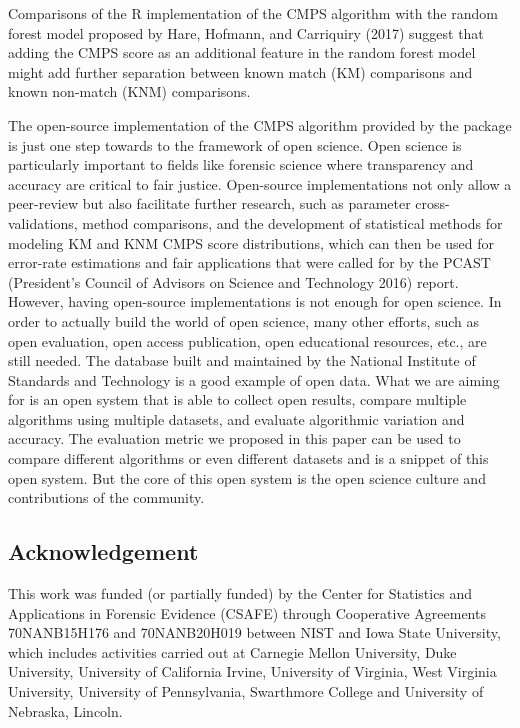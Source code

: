 Comparisons of the R implementation of the CMPS algorithm with the random forest model proposed by Hare, Hofmann, and Carriquiry (2017) suggest that adding the CMPS score as an additional feature in the random forest model might add further separation between known match (KM) comparisons and known non-match (KNM) comparisons.

The open-source implementation of the CMPS algorithm provided by the  package is just one step towards to the framework of open science. Open science is particularly important to fields like forensic science where transparency and accuracy are critical to fair justice.
Open-source implementations not only allow a peer-review but also facilitate further research, such as parameter cross-validations, method comparisons, and the development of statistical methods for modeling KM and KNM CMPS score distributions, which can then be used for error-rate estimations and fair applications that were called for by the PCAST (President's Council of Advisors on Science and Technology 2016) report.
However, having open-source implementations is not enough for open science.
In order to actually build the world of open science, many other efforts, such as open evaluation, open access publication, open educational resources, etc., are still needed.
The database built and maintained by the National Institute of Standards and Technology is a good example of open data.
What we are aiming for is an open system that is able to collect open results, compare multiple algorithms using multiple datasets, and evaluate algorithmic variation and accuracy.
The evaluation metric we proposed in this paper can be used to compare different algorithms or even different datasets and is a snippet of this open system.
But the core of this open system is the open science culture and contributions of the community.

\hypertarget{acknowledgement}{%
\subsection{Acknowledgement}\label{acknowledgement}}

This work was funded (or partially funded) by the Center for Statistics and Applications in Forensic Evidence (CSAFE) through Cooperative Agreements 70NANB15H176 and 70NANB20H019 between NIST and Iowa State University, which includes activities carried out at Carnegie Mellon University, Duke University, University of California Irvine, University of Virginia, West Virginia University, University of Pennsylvania, Swarthmore College and University of Nebraska, Lincoln.


